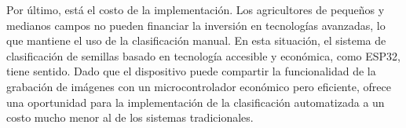 Por último,  está el costo de la implementación. Los agricultores de pequeños y medianos campos no pueden financiar la inversión en tecnologías avanzadas, lo que mantiene el uso de la clasificación manual. En esta situación, el sistema de clasificación de semillas basado en tecnología accesible y económica, como ESP32, tiene sentido. Dado que el dispositivo puede compartir la funcionalidad de la grabación de imágenes con un microcontrolador económico pero eficiente, ofrece una oportunidad para la implementación de la clasificación automatizada a un costo mucho menor al de los sistemas tradicionales.